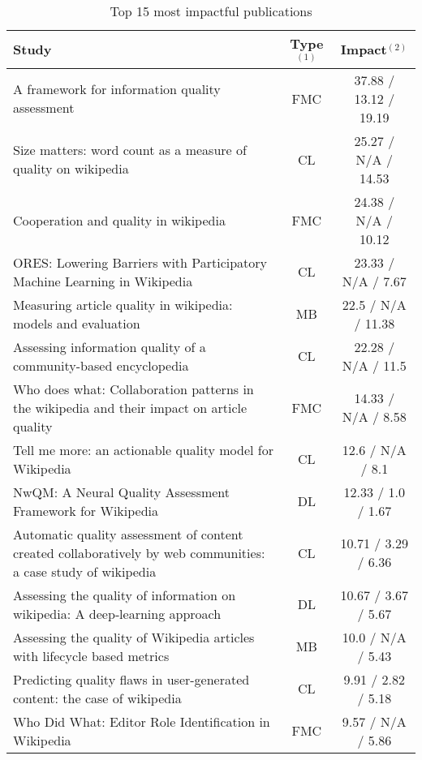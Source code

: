 \begin{table}[htbp]
    \caption{Top 15 most impactful publications}
    \label{tab:impactful}
    \centering
    \begin{tabular}{m{} c c}
        \toprule
        \textbf{Study} & \textbf{Type}$^{(1)}$ & \textbf{Impact}$^{(2)}$ \\
        \midrule
        A framework for information quality assessment~\cite{Stvilia2007_lr1012} & FMC & 37.88 / 13.12 / 19.19 \\
        Size matters: word count as a measure of quality on wikipedia~\cite{Blumenstock2008_lr4} & CL & 25.27 / N/A / 14.53 \\
        Cooperation and quality in wikipedia~\cite{Wilkinson2007_lr2} & FMC & 24.38 / N/A / 10.12 \\
        ORES: Lowering Barriers with Participatory Machine Learning in Wikipedia~\cite{Halfaker2020_lr1055} & CL & 23.33 / N/A / 7.67 \\
        Measuring article quality in wikipedia: models and evaluation~\cite{Hu2007_lr1} & MB & 22.5 / N/A / 11.38 \\
        Assessing information quality of a community-based encyclopedia~\cite{Stvilia2005_lr1013} & CL & 22.28 / N/A / 11.5 \\
        Who does what: Collaboration patterns in the wikipedia and their impact on article quality~\cite{Liu2011_lr3} & FMC & 14.33 / N/A / 8.58 \\
        Tell me more: an actionable quality model for Wikipedia~\cite{Warncke-Wang2013_lr13} & CL & 12.6 / N/A / 8.1 \\
        NwQM: A Neural Quality Assessment Framework for Wikipedia~\cite{Guda2020_lr38} & DL & 12.33 / 1.0 / 1.67 \\
        Automatic quality assessment of content created collaboratively by web communities: a case study of wikipedia~\cite{Dalip2009_lr14} & CL & 10.71 / 3.29 / 6.36 \\
        Assessing the quality of information on wikipedia: A deep‐learning approach~\cite{Wang2020_lr26} & DL & 10.67 / 3.67 / 5.67 \\
        Assessing the quality of Wikipedia articles with lifecycle based metrics~\cite{Wohner2009_lr10} & MB & 10.0 / N/A / 5.43 \\
        Predicting quality flaws in user-generated content: the case of wikipedia~\cite{Anderka2012_lr17} & CL & 9.91 / 2.82 / 5.18 \\
        Who Did What: Editor Role Identification in Wikipedia~\cite{Yang2016_lr2001} & FMC & 9.57 / N/A / 5.86 \\

\end{tabular}
\end{table}
